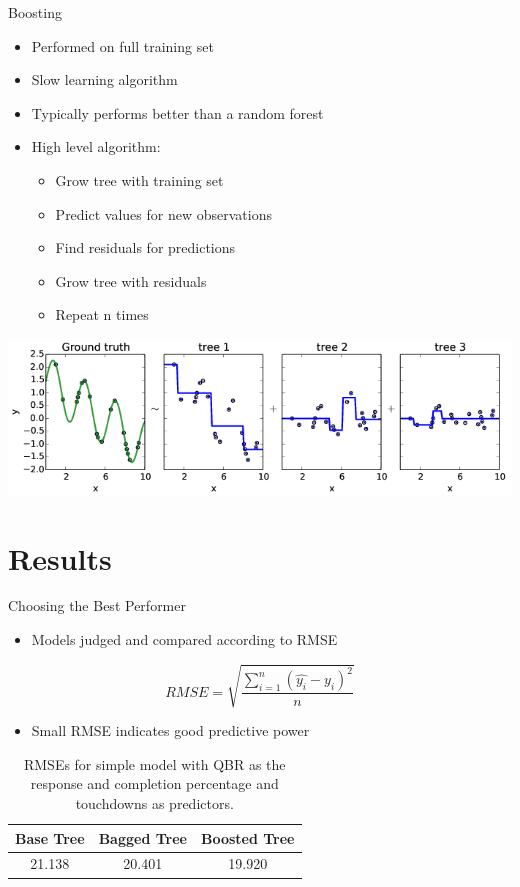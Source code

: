 \documentclass{beamer}
\begin{document}
	\begin{frame}{Boosting}
		\begin{itemize}
			\item Performed on full training set
			\item Slow learning algorithm
			\item Typically performs better than a random forest
			\item High level algorithm:
			\begin{itemize}
				\item Grow tree with training set
				\item Predict values for new observations
				\item Find residuals for predictions
				\item Grow tree with residuals
				\item Repeat n times
			\end{itemize}
		\end{itemize}
		\includegraphics[scale=.4]{boostingex.png}
	\end{frame}
	
	\section{Results}
	
	\begin{frame}{Choosing the Best Performer}
		\begin{itemize}
			\item Models judged and compared according to RMSE
		\end{itemize}
		\begin{equation}
			RMSE=\sqrt{\frac{\sum_{i=1}^{n}(\hat{y_{i}}-y_{i})^{2}}{n}}
		\end{equation}		
		\begin{itemize}
			\item Small RMSE indicates good predictive power
		\end{itemize}
		\begin{table}
			\centering
			\begin{tabular}{|c|c|c|}
				\hline
				Base Tree & Bagged Tree & Boosted Tree\\
				\hline
				21.138 & 20.401 & 19.920\\
				\hline
			\end{tabular}
		\caption{RMSEs for simple model with QBR as the response and completion percentage and touchdowns as predictors.}
		\end{table}
	\end{frame}
\end{document}
